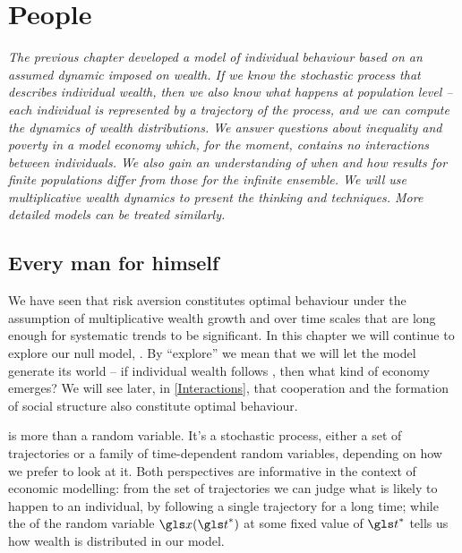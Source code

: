 
\chapter{People}
{\it 
The previous chapter developed a model of individual behaviour based on an
assumed dynamic imposed on wealth. If we know the stochastic process that describes
individual wealth, then we also know what happens at population level -- each individual
is represented by a trajectory of the process, and we can compute 
the dynamics of wealth distributions. We answer questions about inequality and poverty in
a model economy which, for the moment, contains no interactions between individuals. We also gain an understanding of when and how results for finite populations differ from those for the infinite ensemble. We will use multiplicative wealth dynamics to present the thinking and techniques. More detailed models can be treated similarly.}
\newpage


\section{Every man for himself}

We have seen that risk aversion constitutes optimal behaviour under the assumption 
of multiplicative wealth growth and over time scales that are long enough for systematic 
trends to be significant. In this chapter we will continue to explore our null model, 
\GBM. By ``explore'' we mean that we will let the model generate its world -- if 
individual wealth follows \GBM, then what kind of economy emerges? 
We will see later, in \cref{Interactions}, that cooperation and the formation of social structure also constitute optimal behaviour.

\GBM is more than a random variable. It's a stochastic process, either a set of trajectories 
or a family of time-dependent random variables, depending on how we 
prefer to look at it.  Both perspectives are informative in the context of economic modelling:
from the set of trajectories we can judge what is likely to happen to an individual, 
\eg by following a single trajectory for a long time; while the \PDFa of the random 
variable $\x(\t^*)$ at some fixed value of $\t^*$ tells us how wealth is distributed in our model. 

